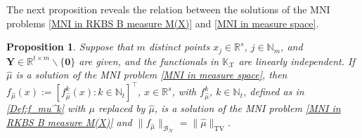 \documentclass[11pt]{article}
\newtheorem{proposition}[theorem]{Proposition}
\begin{document}
The next proposition reveals the relation between the solutions of the MNI problems \eqref{MNI in RKBS B measure M(X)} and \eqref{MNI in measure space}. 

\begin{proposition}\label{prop: MNI solution for measure space is solution for RKBS}
Suppose that $m$ distinct points $x_j\in\mathbb{R}^s$, $j\in\mathbb{N}_m$, and $\mathbf{Y}\in\mathbb{R}^{t\times m}\backslash\{\mathbf{0}\}$ are given, and the functionals in $\mathbb{K}_\mathcal{X}$ are linearly independent. 
If ${\hat{\mu}}$ is a solution of the MNI problem \eqref{MNI in measure space}, then  
$f_{\hat\mu}(x):=\left[f_{\hat\mu}^k(x): k\in\mathbb{N}_t\right]^\top$, $x\in\mathbb{R}^s$,
with $f_{\hat\mu}^k$, $k\in\mathbb{N}_t$, defined as in  \eqref{Def:f_mu^k} with $\mu$ replaced by $\hat{\mu}$, is a solution of the MNI problem \eqref{MNI in RKBS B measure M(X)} 
%
and $\|f_{{\hat{\mu}}}\|_{\mathcal{B}_{\mathcal{N}}}=\|{\hat{\mu}}\|_{\mathrm{TV}}$. 
\end{proposition}
\end{document}
